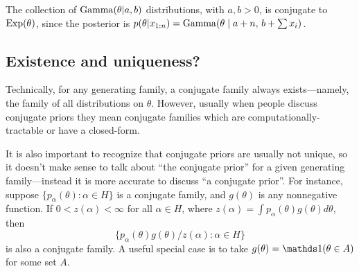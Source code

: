 \documentclass[12pt]{article}
\begin{document}
\begin{example}
The collection of $\operatorname*{Gamma}(\theta|a,b)$ distributions, with $a,b>0$, is conjugate to $\operatorname*{Exp}(\theta)$, since the posterior is $p(\theta|x_{1:n}) = \operatorname*{Gamma}(\theta\mid a+n,\,b+\sum x_i)$.
\end{example}

\subsection{Existence and uniqueness?}
Technically, for any generating family, a conjugate family always exists---namely, the family of all distributions on $\theta$. However, usually when people discuss conjugate priors they mean conjugate families which are computationally-tractable or have a closed-form.

It is also important to recognize that conjugate priors are usually not unique, so it doesn't make sense to talk about ``the conjugate prior'' for a given generating family---instead it is more accurate to discuss ``a conjugate prior''. For instance, suppose $\{p_\alpha(\theta):\alpha\in H\}$ is a conjugate family, and $g(\theta)$ is any nonnegative function. If $0<z(\alpha)<\infty$ for all $\alpha\in H$, where $z(\alpha) = \int p_\alpha(\theta)g(\theta)d\theta$, then
$$\big\{p_\alpha(\theta)g(\theta)/z(\alpha) : \alpha\in H\big\}$$
is also a conjugate family.
A useful special case is to take $g(\theta) =\I(\theta\in A)$ for some set $A$.
\end{document}
